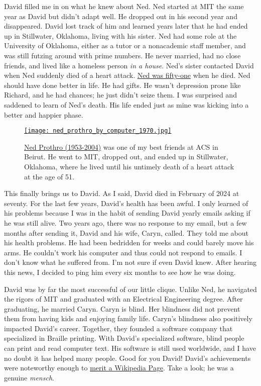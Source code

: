 David filled me in on what he knew about Ned. Ned started at MIT the
same year as David but didn't adapt well. He dropped out in his second
year and disappeared. David lost track of him and learned years later
that he had ended up in Stillwater, Oklahoma, living with his sister.
Ned had some role at the University of Oklahoma, either as a tutor or a
nonacademic staff member, and was still futzing around with prime
numbers. He never married, had no close friends, and lived like a
homeless person \emph{in a house}. Ned's sister contacted David when Ned
suddenly died of a heart attack.
\href{https://www.findagrave.com/memorial/11932084/edwin_terry-prothro}{Ned
was fifty-one} when he died. Ned should have done better in life. He had
gifts. He wasn't depression prone like Richard, and he had chances; he
just didn't seize them. I was surprised and saddened to learn of Ned's
death. His life ended just as mine was kicking into a better and happier
phase.


\captionsetup[figure]{labelformat=empty}
\begin{SCfigure}
\centering
\href{https://conceptcontrol.smugmug.com/Places/Overseas/Beirut-Lebanon-1960s-1/i-sG6bVnH/A}{\texttt{[image: ned\_prothro\_by\_computer\_1970.jpg]}}
\caption[Ned Prothro (1953-2004)]{\href{https://www.findagrave.com/memorial/11932084/edwin_terry-prothro}{Ned
Prothro (1953-2004)} was one of my best friends at ACS in Beirut. He
went to MIT, dropped out, and ended up in Stillwater, Oklahoma, where he
lived until his untimely death of a heart attack at the age of 51.}
\label{fig:8196x2}
\end{SCfigure}
 

This finally brings us to David. As I said, David died in February of
2024 at seventy. For the last few years, David's health has been awful.
I only learned of his problems because I was in the habit of sending
David yearly emails asking if he was still alive. Two years ago, there
was no response to my email, but a few months after sending it, David
and his wife, Caryn, called. They told me about his health problems. He
had been bedridden for weeks and could barely move his arms. He couldn't
work his computer and thus could not respond to emails. I don't know
what he suffered from. I'm not sure if even David knew. After hearing
this news, I decided to ping him every six months to see how he was
doing.

David was by far the most successful of our little clique. Unlike Ned,
he navigated the rigors of MIT and graduated with an Electrical
Engineering degree. After graduating, he married Caryn. Caryn is blind.
Her blindness did not prevent them from having kids and enjoying family
life. Caryn's blindness also positively impacted David's career.
Together, they founded a software company that specialized in Braille
printing. With David's specialized software, blind people can print and
read computer text. His software is still used worldwide, and I have no
doubt it has helped many people. Good for you David! David's
achievements were noteworthy enough to
\href{https://en.wikipedia.org/wiki/David_Holladay}{merit a Wikipedia
Page}. Take a look; he was a genuine \emph{mensch}.

